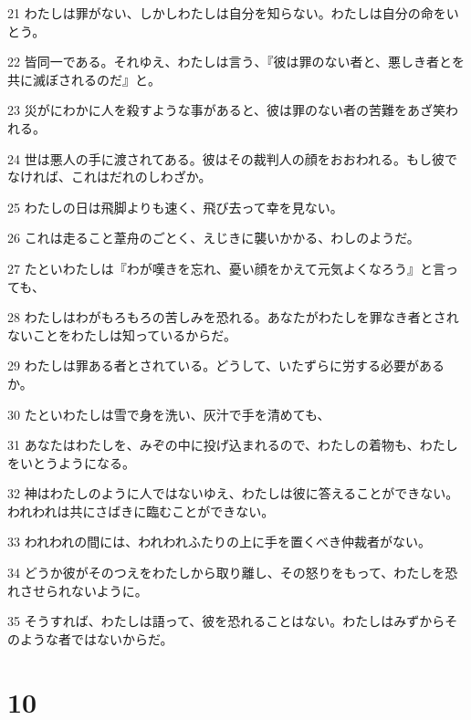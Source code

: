 \par 21 わたしは罪がない、しかしわたしは自分を知らない。わたしは自分の命をいとう。
\par 22 皆同一である。それゆえ、わたしは言う、『彼は罪のない者と、悪しき者とを共に滅ぼされるのだ』と。
\par 23 災がにわかに人を殺すような事があると、彼は罪のない者の苦難をあざ笑われる。
\par 24 世は悪人の手に渡されてある。彼はその裁判人の顔をおおわれる。もし彼でなければ、これはだれのしわざか。
\par 25 わたしの日は飛脚よりも速く、飛び去って幸を見ない。
\par 26 これは走ること葦舟のごとく、えじきに襲いかかる、わしのようだ。
\par 27 たといわたしは『わが嘆きを忘れ、憂い顔をかえて元気よくなろう』と言っても、
\par 28 わたしはわがもろもろの苦しみを恐れる。あなたがわたしを罪なき者とされないことをわたしは知っているからだ。
\par 29 わたしは罪ある者とされている。どうして、いたずらに労する必要があるか。
\par 30 たといわたしは雪で身を洗い、灰汁で手を清めても、
\par 31 あなたはわたしを、みぞの中に投げ込まれるので、わたしの着物も、わたしをいとうようになる。
\par 32 神はわたしのように人ではないゆえ、わたしは彼に答えることができない。われわれは共にさばきに臨むことができない。
\par 33 われわれの間には、われわれふたりの上に手を置くべき仲裁者がない。
\par 34 どうか彼がそのつえをわたしから取り離し、その怒りをもって、わたしを恐れさせられないように。
\par 35 そうすれば、わたしは語って、彼を恐れることはない。わたしはみずからそのような者ではないからだ。

\chapter{10}


